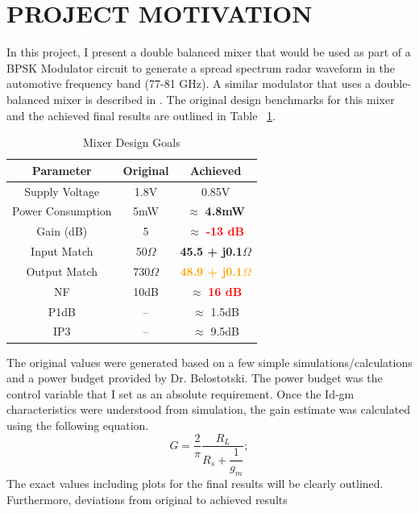 \documentclass{article}                                                         %
\begin{document}
\section{PROJECT MOTIVATION}
In this project, I present a double balanced mixer that would be used as part of a  BPSK Modulator circuit
to generate a spread spectrum radar waveform in the automotive frequency band (77-81 GHz). A similar modulator
that uses a double-balanced mixer is described in \cite{schleicher2010biphase}. The original design benchmarks for this mixer
and the achieved final results are outlined in Table ~\ref{table:goalsnresults}.\vspace{3mm}
\vspace{3mm}
\begin{table}[H]
\centering
 \begin{tabular}{ | c | c | c |}
   \hline
    \textbf{Parameter} & \textbf{Original} & \textbf{Achieved}  \\
    \hline
    \hline
    Supply Voltage & 1.8V & 0.85V \\
    \hline
    Power Consumption & 5mW & $\approx$ \textbf{\textcolor{OliveGreen}{4.8mW}}\\
    \hline
    Gain (dB)   & 5 & $\approx$ \textbf{\textcolor{Red}{-13 dB}} \\
    \hline
    Input Match  & 50$\Omega$ & \textbf{\textcolor{OliveGreen}{45.5 + j0.1$\Omega$}} \\
    \hline
    Output Match & 730$\Omega$ & \textbf{\textcolor{Orange}{48.9 + j0.1$\Omega$}}\\
    \hline
    NF & 10dB & $\approx$ \textbf{\textcolor{Red}{16 dB}}\\
    \hline
    P1dB & -- & $\approx$ 1.5dB  \\
    \hline
    IP3 & -- & $\approx$ 9.5dB  \\
    \hline
  \end{tabular}
  \caption{Mixer Design Goals}
  \label{table:goalsnresults}
\end{table}
The original values were generated based on a few simple simulations/calculations and a power budget provided by Dr. Belostotski. The
power budget was the control variable that I set as an absolute requirement.  Once the Id-gm
characteristics were understood from simulation, the gain estimate was calculated using the following equation.
\begin{equation}
  \label{eq:idealgain}
  G=\dfrac{2}{\pi}\dfrac{R_L}{R_s + \dfrac{1}{g_m}};
\end{equation}
The exact values including plots for the final results will be clearly outlined. Furthermore, deviations from original to achieved results
\end{document}
